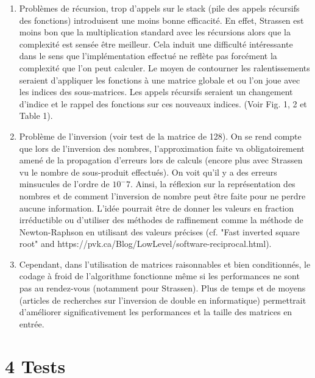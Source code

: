 \documentclass[a4paper,fleqn]{article}
\begin{document}
\begin{enumerate}
  \item Problèmes de récursion, trop d'appels sur le stack (pile des appels récursifs des fonctions) introduisent une moins bonne efficacité. En effet, Strassen est moins bon que la multiplication standard avec les récursions alors que la complexité est sensée être meilleur. Cela induit une difficulté intéressante dans le sens que l'implémentation effectué ne reflète pas forcément la complexité que l'on peut calculer. Le moyen de contourner les ralentissements seraient d'appliquer les fonctions à une matrice globale et ou l'on joue avec les indices des sous-matrices. Les appels récursifs seraient un changement d'indice et le rappel des fonctions sur ces nouveaux indices. (Voir Fig. 1, 2 et Table 1).
  

  \item Problème de l'inversion (voir test de la matrice de 128). On se rend compte que lors de l'inversion des nombres, l'approximation faite va obligatoirement amené de la propagation d'erreurs lors de calculs (encore plus avec Strassen vu le nombre de sous-produit effectués). On voit qu'il y a des erreurs minsucules de l'ordre de $10^-7$. Ainsi, la réflexion sur la représentation des nombres et de comment l'inversion de nombre peut être faite pour ne perdre aucune information. L'idée pourrait être de donner les valeurs en fraction irréductible ou d'utiliser des méthodes de raffinement comme la méthode de Newton-Raphson en utilisant des valeurs précises (cf. "Fast inverted square root" and https://pvk.ca/Blog/LowLevel/software-reciprocal.html).

  \item Cependant, dans l'utilisation de matrices raisonnables et bien conditionnés, le codage à froid de l'algorithme fonctionne même si les performances ne sont pas au rendez-vous (notamment pour Strassen). Plus de temps et de moyens (articles de recherches sur l'inversion de double en informatique) permettrait d'améliorer significativement les performances et la taille des matrices en entrée. \end{enumerate}
 
 
\section{4 Tests}
\end{document}
